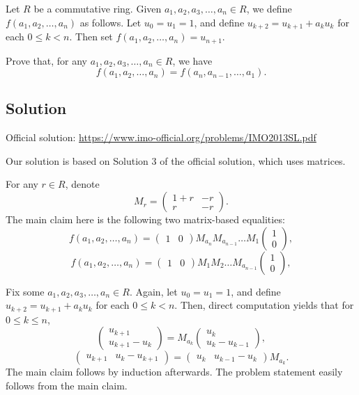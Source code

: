 Let $R$ be a commutative ring.
Given $a_1, a_2, a_3, \ldots, a_n \in R$, we define $f(a_1, a_2, \ldots, a_n)$ as follows.
Let $u_0 = u_1 = 1$, and define $u_{k + 2} = u_{k + 1} + a_k u_k$ for each $0 \leq k < n$.
Then set $f(a_1, a_2, \ldots, a_n) = u_{n + 1}$.

Prove that, for any $a_1, a_2, a_3, \ldots, a_n \in R$, we have
\[ f(a_1, a_2, \ldots, a_n) = f(a_n, a_{n - 1}, \ldots, a_1). \]



\subsection*{Solution}

Official solution: \url{https://www.imo-official.org/problems/IMO2013SL.pdf}

Our solution is based on Solution 3 of the official solution, which uses matrices.

For any $r \in R$, denote
\[ M_r = \begin{pmatrix} 1 + r & -r \\ r & -r \end{pmatrix}. \]
The main claim here is the following two matrix-based equalities:
\[ f(a_1, a_2, \ldots, a_n) = \begin{pmatrix} 1 & 0 \end{pmatrix} M_{a_n} M_{a_{n - 1}} \ldots M_1 \begin{pmatrix} 1 \\ 0 \end{pmatrix}, \]
\[ f(a_1, a_2, \ldots, a_n) = \begin{pmatrix} 1 & 0 \end{pmatrix} M_1 M_2 \ldots M_{a_{n - 1}} \begin{pmatrix} 1 \\ 0 \end{pmatrix}, \]

Fix some $a_1, a_2, a_3, \ldots, a_n \in R$.
Again, let $u_0 = u_1 = 1$, and define $u_{k + 2} = u_{k + 1} + a_k u_k$ for each $0 \leq k < n$.
Then, direct computation yields that for $0 \leq k \leq n$,
\[ \begin{pmatrix} u_{k + 1} \\ u_{k + 1} - u_k \end{pmatrix} = M_{a_k} \begin{pmatrix} u_k \\ u_k - u_{k - 1} \end{pmatrix}, \]
\[ \begin{pmatrix} u_{k + 1} & u_k - u_{k + 1} \end{pmatrix} = \begin{pmatrix} u_k & u_{k - 1} - u_k \end{pmatrix} M_{a_k}. \]
The main claim follows by induction afterwards.
The problem statement easily follows from the main claim.
